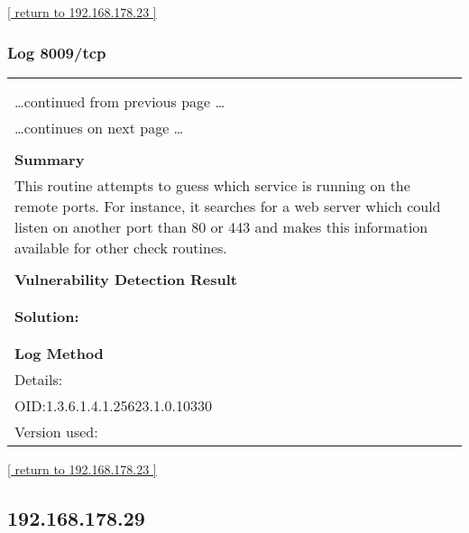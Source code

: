 \documentclass{article}
\begin{document}
\begin{footnotesize}\hyperref[host:192.168.178.23]{[ return to 192.168.178.23 ]}\end{footnotesize}
\subsubsection{Log 8009/tcp}
\label{port:192.168.178.23 8009/tcp Log}

\begin{longtable}{|p{}|}
\hline
\rowcolor{gvm_log}{\color{white}{Log (CVSS: 0.0) }}\\
\rowcolor{gvm_log}{\color{white}{NVT: Services}}\\
\hline
\endfirsthead
\hfill\ldots continued from previous page \ldots \\
\hline
\endhead
\hline
\ldots continues on next page \ldots \\
\endfoot
\hline
\endlastfoot
\\
\textbf{Summary}\\
This routine attempts to guess which service is running on the
  remote ports. For instance, it searches for a web server which could listen on another port than
  80 or 443 and makes this information available for other check routines.\\

        \hline
        \\
\textbf{Vulnerability Detection Result}\\
\rowcolor{white}{\verb=A web server is running on this port=}\\

          \hline
          \\
\textbf{Solution:}\\
\\


        \hline
        \\
\textbf{Log Method}\\
Details:
\rowcolor{white}{\verb=Services=}\\
OID:1.3.6.1.4.1.25623.1.0.10330\\
Version used:
\rowcolor{white}{\verb=2021-03-15T10:42:03Z=}\\
\end{longtable}

\begin{footnotesize}\hyperref[host:192.168.178.23]{[ return to 192.168.178.23 ]}\end{footnotesize}
\subsection{192.168.178.29}
\label{host:192.168.178.29}
\end{document}
